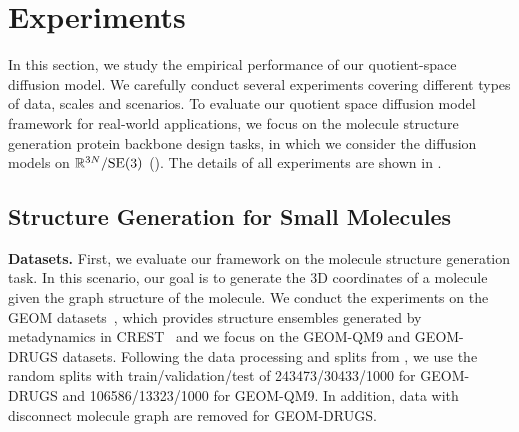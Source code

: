 \documentclass{article} %
\newcommand{\SE}{\mathrm{SE}}
\begin{document}
\section{Experiments} \label{sec:expm}
\vspace{-2pt}

In this section, we study the empirical performance of our quotient-space diffusion model. We carefully conduct several experiments covering different types of data, scales and scenarios. To evaluate our quotient space diffusion model framework for real-world applications, we focus on the molecule structure generation protein backbone design tasks, in which we consider the diffusion models on $\bbR^{3N}/\SE(3)$ (). The details of all experiments are shown in .

\subsection{Structure Generation for Small Molecules}


\textbf{Datasets.} First, we evaluate our framework on the molecule structure generation task. In this scenario, our goal is to generate the 3D coordinates of a molecule given the graph structure of the molecule. We conduct the experiments on the GEOM datasets~\citep{axelrod2022geom}, which provides structure ensembles generated by metadynamics in CREST~\citep{pracht2024crest} and we focus on the GEOM-QM9 and GEOM-DRUGS datasets. Following the data processing and splits from \citet{hassan2024flow}, we use the random splits with train/validation/test of 243473/30433/1000 for GEOM-DRUGS and 106586/13323/1000 for GEOM-QM9. In addition, data with disconnect molecule graph are removed for GEOM-DRUGS. 
\end{document}
